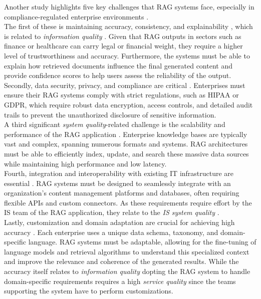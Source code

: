 \documentclass[
	english,
	ruledheaders=section,%
	class=report,%
	thesis={type=bachelor},%
	accentcolor=1b,%
	custommargins=true,%
	marginpar=false,%
	parskip=half-,%
	fontsize=11pt,%
	DIV=14,
]{tudapub}
\begin{document}
Another study highlights five key challenges that RAG systems face, especially in compliance-regulated enterprise environments \parencite[p.~6]{Bruckhaus2024RAG}.\\
The first of these is maintaining accuracy, consistency, and explainability \parencite[p.~6]{Bruckhaus2024RAG}, which is related to \textit{information quality} \parencite[pp.~64--66]{DeloneMcLean1992ISSuccess}. Given that RAG outputs in sectors such as finance or healthcare can carry legal or financial weight, they require a higher level of trustworthiness and accuracy. Furthermore, the systems must be able to explain how retrieved documents influence the final generated content and provide confidence scores to help users assess the reliability of the output.\\
Secondly, data security, privacy, and compliance are critical \parencite[p.~6]{Bruckhaus2024RAG}. Enterprises must ensure their RAG systems comply with strict regulations, such as HIPAA or GDPR, which require robust data encryption, access controls, and detailed audit trails to prevent the unauthorized disclosure of sensitive information.\\
A third significant \textit{system quality}-related \parencite[p.~64]{DeloneMcLean1992ISSuccess} challenge is the scalability and performance of the RAG application \parencite[p.~6]{Bruckhaus2024RAG}. Enterprise knowledge bases are typically vast and complex, spanning numerous formats and systems. RAG architectures must be able to efficiently index, update, and search these massive data sources while maintaining high performance and low latency.\\
Fourth, integration and interoperability with existing IT infrastructure are essential \parencite[p.~6]{Bruckhaus2024RAG}. RAG systems must be designed to seamlessly integrate with an organization's content management platforms and databases, often requiring flexible APIs and custom connectors. As these requirements require effort by the IS team of the RAG application, they relate to the \textit{IS system quality} \parencite[pp.~58--59]{Jennex2006}.\\
Lastly, customization and domain adaptation are crucial for achieving high accuracy \parencite[p.~6]{Bruckhaus2024RAG}. Each enterprise uses a unique data schema, taxonomy, and domain-specific language. RAG systems must be adaptable, allowing for the fine-tuning of language models and retrieval algorithms to understand this specialized context and improve the relevance and coherence of the generated results. While the accuracy itself relates to \textit{information quality} \parencite[pp.~64--66]{DeloneMcLean1992ISSuccess} dopting the RAG system to handle domain-specific requirements requires a high \textit{service quality} \parencite[p.~17]{DeloneMcLean2003ISSuccessTenYearUpdate} since the teams supporting the system have to perform customizations.\\
\end{document}
